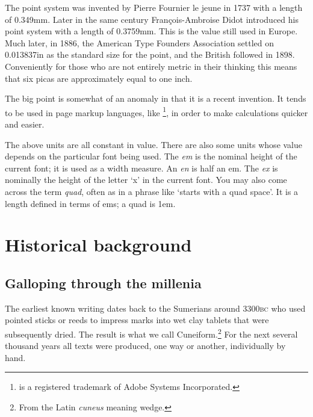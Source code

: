 \documentclass[10pt,letterpaper,extrafontsizes]{memoir}
\newcommand{\PWnote}[2]{}
\begin{document}
    The point system was invented by Pierre Fournier le jeune in 1737 with
a length of 0.349mm. Later in the same century Fran\c{c}ois-Ambroise Didot
introduced his point system with a length of 0.3759mm. This is the value
still used in Europe. Much later, in 1886, the American Type Founders
Association settled on 0.013837in as the standard size for the point, and
the British followed in 1898. Conveniently for those who are not entirely
metric in their thinking this means that 
six picas are approximately equal to one inch.

    The big point 
is somewhat of an anomaly in that it is a recent
invention. It tends to be used
in page markup languages, like \pscript\footnote{\pscript{} is a 
registered trademark of Adobe Systems Incorporated.\label{fn:ps}},
in order to make calculations quicker and easier.

    The above units are all constant in value. There are also some units
whose value depends on the particular font being used. 
The \textit{em}
is the nominal height of the current font; it is used as a width measure.
An \textit{en} is half an em.
The \textit{ex} is
nominally the height of the letter `x' in the current font. You may also
come across the term \textit{quad}, often as in a phrase
like `starts with a quad space'. It is a length defined in terms of
ems; a quad is 1em.


\cleardoublepage

\mainmatter



\PWnote{2009/02/02}{Added Historical background chapter}
\chapter{Historical background} \label{chap:history}

\section{Galloping through the millenia}

    The earliest known writing dates back to the Sumerians around 3300\textsc{bc}
who used pointed sticks or reeds to impress marks into wet clay tablets
that were subsequently dried. The result is what we call 
Cuneiform.\footnote{From the Latin \emph{cuneus} meaning wedge.}
For the next several thousand years all texts were produced, one way or 
another, individually by hand.
\end{document}
